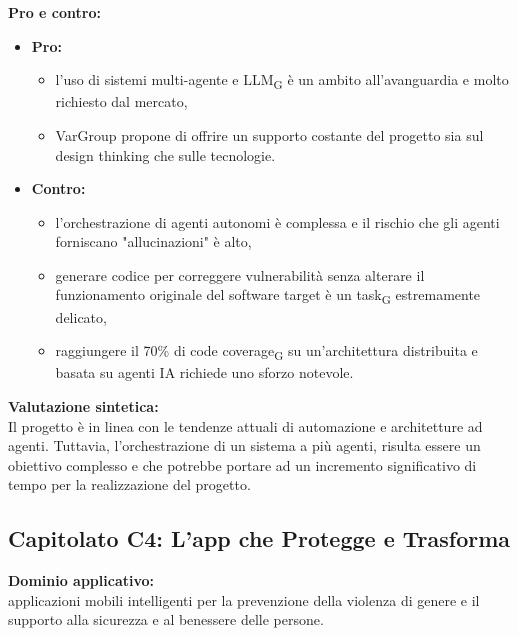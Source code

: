 \vspace{0.3cm}
\textbf{Pro e contro:}
\begin{itemize}
	\item \textbf{Pro:} 
        \begin{itemize}
            \item l'uso di sistemi multi-agente e LLM\textsubscript{G} è un ambito all'avanguardia e molto richiesto dal mercato,
            \item VarGroup propone di offrire un supporto costante del progetto sia sul design thinking che sulle tecnologie.
        \end{itemize}
	\item \textbf{Contro:}
        \begin{itemize}
            \item l'orchestrazione di agenti autonomi è complessa e il rischio che gli agenti forniscano "allucinazioni" è alto,
            \item generare codice per correggere vulnerabilità senza alterare il funzionamento originale del software target è un task\textsubscript{G} estremamente delicato,
            \item raggiungere il 70\% di code coverage\textsubscript{G} su un'architettura distribuita e basata su agenti IA richiede uno sforzo notevole.
        \end{itemize}
\end{itemize}

\vspace{0.3cm}
\textbf{Valutazione sintetica:} \\
Il progetto è in linea con le tendenze attuali di automazione e architetture ad agenti. Tuttavia, l'orchestrazione di un sistema a più agenti, risulta essere un obiettivo complesso e che potrebbe portare ad un incremento significativo di tempo per la realizzazione del progetto.

\vspace{0.5cm}

\vspace{0.5cm}

\subsection{Capitolato C4: {L'app che Protegge e Trasforma} }

\textbf{Dominio applicativo:} \\
{applicazioni mobili intelligenti per la prevenzione della violenza di genere e il supporto alla sicurezza e al benessere delle persone.}

